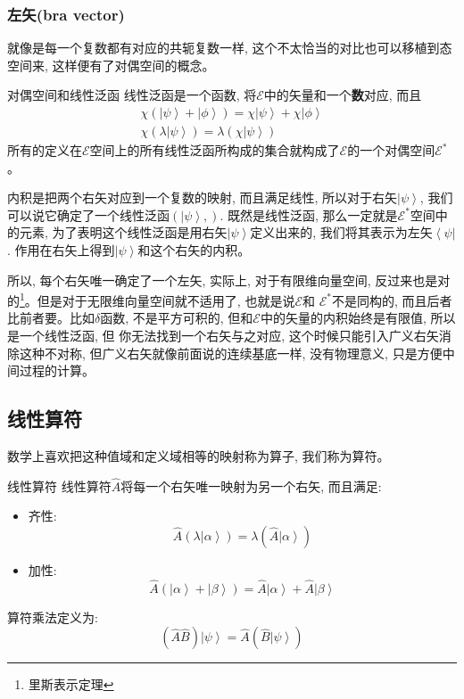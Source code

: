 \subsubsection*{左矢(bra vector)}
就像是每一个复数都有对应的共轭复数一样, 这个不太恰当的对比也可以移植到态空间来, 这样便有了对偶空间的概念。
\begin{define}{对偶空间和线性泛函}
    线性泛函是一个函数, 将$\mathscr{E}$中的矢量和一个\textbf{数}对应, 而且
    \[
    \begin{array}{l}
        \chi \left( {\left| \psi  \right\rangle  + \left| \phi  \right\rangle } \right) = \chi \left| \psi  \right\rangle  + \chi \left| \phi  \right\rangle \\
        \chi \left( {\lambda \left| \psi  \right\rangle } \right) = \lambda \left( {\chi \left| \psi  \right\rangle } \right)
    \end{array}\]
    所有的定义在$\mathscr{E}$空间上的所有线性泛函所构成的集合就构成了$\mathscr{E}$的一个对偶空间$\mathscr{E}^*$。
\end{define}
内积是把两个右矢对应到一个复数的映射, 而且满足线性, 所以对于右矢$\left| \psi  \right\rangle$, 我们可以说它确定了一个线性泛函$\left(\left| \psi  \right\rangle, \right)$.
既然是线性泛函, 那么一定就是$\mathscr{E}^*$空间中的元素, 为了表明这个线性泛函是用右矢$\left| \psi  \right\rangle$定义出来的, 我们将其表示为左矢$\left\langle \psi  \right|$.
作用在右矢上得到$\left| \psi  \right\rangle$和这个右矢的内积。

所以, 每个右矢唯一确定了一个左矢, 实际上, 对于有限维向量空间, 反过来也是对的\footnote[1]{里斯表示定理}。但是对于无限维向量空间就不适用了, 也就是说$\mathscr{E}$和
$\mathscr{E}^*$不是同构的, 而且后者比前者要。比如$\delta$函数, 不是平方可积的, 但和$\mathscr{E}$中的矢量的内积始终是有限值, 所以是一个线性泛函, 但
你无法找到一个右矢与之对应, 这个时候只能引入广义右矢消除这种不对称, 但广义右矢就像前面说的连续基底一样, 没有物理意义, 只是方便中间过程的计算。

\subsection*{线性算符}
数学上喜欢把这种值域和定义域相等的映射称为算子, 我们称为算符。
\begin{define}{线性算符}
    线性算符$\hat{A}$将每一个右矢唯一映射为另一个右矢, 而且满足:
    \begin{itemize}
        \item 齐性: \[\hat {A}\left( {\lambda \left| \alpha  \right\rangle } \right) = \lambda \left( {\hat{A}\left| \alpha  \right\rangle } \right)\]
        \item 加性: \[\hat {A}\left( {\left| \alpha  \right\rangle  + \left| \beta  \right\rangle } \right) = \hat {A}\left| \alpha  \right\rangle  + \widehat A\left| \beta  \right\rangle \]
    \end{itemize}
\end{define}
算符乘法定义为:\[( {\hat A\hat B} )\left| \psi  \right\rangle  = \hat A\left( {\hat B\left| \psi  \right\rangle } \right)\]

